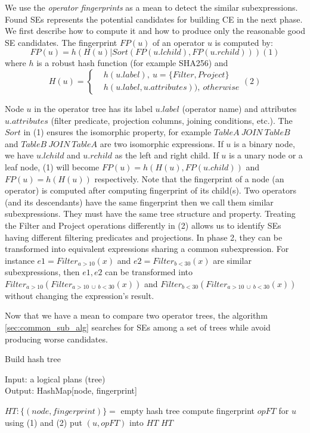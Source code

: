 We use the \emph{operator fingerprints} as a mean to detect the similar subexpressions. Found SEs  represents the potential candidates for building CE in the next phase. We first describe how to compute it and how to produce only the reasonable good SE candidates. The fingerprint $FP(u)$ of an operator $u$ is computed by:
\[FP(u)= h(H(u) | Sort(FP(u.lchild), FP(u.rchild))) (1)\]
where $h$ is a robust hash function (for example SHA256) and 
\[H(u)=
\begin{cases}
 & h(u.label),\ u= \{Filter, Project\}\\ 
 & h(u.label, u.attributes)),\ otherwise
\end{cases} (2)\]

Node $u$ in the operator tree has its label $u.label$ (operator name) and attributes $u.attributes$ (filter predicate, projection columns, joining conditions, etc.). The $Sort$ in (1) ensures the isomorphic property, for example $TableA\ JOIN\ TableB$ and $TableB\ JOIN\ TableA$ are two isomorphic expressions. If $u$ is a binary node, we have $u.lchild$ and $u.rchild$ as the left and right child. If $u$ is a unary node or a leaf node, (1) will become $FP(u)= h(H(u), FP(u.child))$ and $FP(u)= h(H(u))$ respectively. Note that the fingerprint of a node (an operator) is computed after computing fingerprint of its child(s). Two operators (and its descendants) have the same fingerprint then we call them similar subexpressions. They must have the same tree structure and property. Treating the Filter and Project operations differently in (2) allows us to identify SEs having different filtering predicates and projections. In phase 2, they can be transformed into equivalent expressions sharing a common subexpression. For instance $e1 = Filter_{a>10}(x)$ and $e2 = Filter_{b<30}(x)$ are similar subexpressions, then $e1, e2$ can be transformed into $Filter_{a>10}(Filter_{a>10\ \cup \ b < 30}(x))$ and $Filter_{b<30}(Filter_{a>10\ \cup \ b < 30}(x))$ without changing the expression's result.

Now that we have a mean to compare two operator trees, the algorithm \ref{sec:common_sub_alg} searches for SEs among a set of trees while avoid producing worse candidates.

\begin{algorithm}
	\caption{Build hash tree}\label{sec:buildht_alg}
	Input: a logical plans (tree)\\
	Output: HashMap[node, fingerprint]
	\begin{algorithmic}[1]
		\State $HT:\{(node, fingerprint)\}=$ empty hash tree
			\State compute fingerprint $opFT$ for $u$ using (1) and (2)
			\State put $(u, opFT)$ into $HT$
		\EndFor
		\State \Return  $HT$
		\EndProcedure
	\end{algorithmic}
\end{algorithm}

